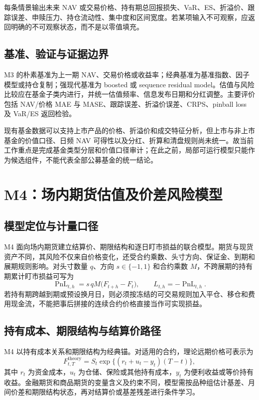 每条情景输出未来 NAV 或交易价格、持有期总回报损失、VaR、ES、折溢价、跟踪误差、申赎压力、持仓流动性、集中度和区间宽度。若某项输入不可观察，应返回明确的不可观察状态，而不是以零值填充。

\subsection{基准、验证与证据边界}

M3 的朴素基准为上一期 NAV、交易价格或收益率；经典基准为基准指数、因子模型或持仓复制；强现代基准为 boosted 或 sequence residual model。估值与风险比较应在基金子类内进行，并统一估值频率、信息发布日期和分红调整。主要评价包括 NAV/价格 MAE 与 MASE、跟踪误差、折溢价误差、CRPS、pinball loss 及 VaR/ES 返回检验。

现有基金数据可以支持上市产品的价格、折溢价和成交特征分析，但上市与非上市基金的价值口径、日频 NAV 可得性以及分红、折算和清盘规则尚未统一。故当前工作重点是完成基金类型分层和价值口径审计；在此之前，局部可运行模型只能作为候选组件，不能代表全部公募基金的统一结论。

\section{M4：场内期货估值及价差风险模型}
\label{sec:m4-futures}

\subsection{模型定位与计量口径}

M4 面向场内期货建立结算价、期限结构和逐日盯市损益的联合模型。期货与现货资产不同，其风险不仅来自价格变化，还受合约乘数、头寸方向、保证金、到期和展期规则影响。对头寸数量 \(q\)、方向 \(s\in\{-1,1\}\) 和合约乘数 \(M\)，不跨展期的持有期累计盯市损益可写为
\begin{equation}
  \operatorname{PnL}_{t,h}=s\,qM\bigl(F_{t+h}-F_t\bigr),
  \qquad L_{t,h}=-\operatorname{PnL}_{t,h}.
\end{equation}
若持有期跨越到期或预设换月日，则必须按冻结的可交易规则加入平仓、移仓和费用现金流，不能把事后拼接的连续合约价格直接当作可实现损益。

\subsection{持有成本、期限结构与结算价路径}

M4 以持有成本关系和期限结构为经典锚。对适用的合约，理论远期价格可表示为
\begin{equation}
  F_{t,T}^{\mathrm{theory}}
  =S_t\exp\{(r_t+u_t-y_t)(T-t)\},
\end{equation}
其中 \(r_t\) 为资金成本，\(u_t\) 为仓储、保险或其他持有成本，\(y_t\) 为便利收益或等价持有收益。金融期货和商品期货的变量含义及约束不同，模型需按品种组估计基差、月间价差和期限结构状态，再对结算价或基差残差进行条件学习。

